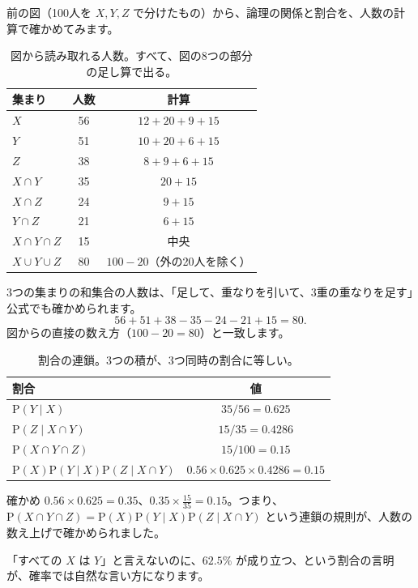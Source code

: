 \documentclass[a4paper,11pt,openany]{ltjsbook}
\newcommand{\Prob}{\mathrm{P}}
\begin{document}
前の図（100人を $X,Y,Z$ で分けたもの）から、論理の関係と割合を、人数の計算で確かめてみます。

\begin{table}[htbp]
\centering
\begin{tabular}{lcc}
\toprule
集まり & 人数 & 計算\\
\midrule
$X$ & 56 & $12+20+9+15$\\
$Y$ & 51 & $10+20+6+15$\\
$Z$ & 38 & $8+9+6+15$\\
$X\cap Y$ & 35 & $20+15$\\
$X\cap Z$ & 24 & $9+15$\\
$Y\cap Z$ & 21 & $6+15$\\
$X\cap Y\cap Z$ & 15 & 中央\\
$X\cup Y\cup Z$ & 80 & $100-20$（外の20人を除く）\\
\bottomrule
\end{tabular}
\caption{図から読み取れる人数。すべて、図の8つの部分の足し算で出る。}
\end{table}

3つの集まりの和集合の人数は、「足して、重なりを引いて、3重の重なりを足す」公式でも確かめられます。
\[
56+51+38-35-24-21+15=80 .
\]
図からの直接の数え方（$100-20=80$）と一致します。

\begin{table}[htbp]
\centering
\begin{tabular}{lc}
\toprule
割合 & 値\\
\midrule
$\Prob(Y\mid X)$ & $35/56=0.625$\\
$\Prob(Z\mid X\cap Y)$ & $15/35=0.4286$\\
$\Prob(X\cap Y\cap Z)$ & $15/100=0.15$\\
$\Prob(X)\Prob(Y\mid X)\Prob(Z\mid X\cap Y)$ & $0.56\times0.625\times0.4286=0.15$\\
\bottomrule
\end{tabular}
\caption{割合の連鎖。3つの積が、3つ同時の割合に等しい。}
\end{table}

\begin{examplebox}{確かめ}
$0.56\times0.625=0.35$、$0.35\times\tfrac{15}{35}=0.15$。つまり、$\Prob(X\cap Y\cap Z)=\Prob(X)\Prob(Y\mid X)\Prob(Z\mid X\cap Y)$ という連鎖の規則が、人数の数え上げで確かめられました。
\end{examplebox}

「すべての $X$ は $Y$」と言えないのに、$62.5\%$ が成り立つ、という割合の言明が、確率では自然な言い方になります。
\end{document}
